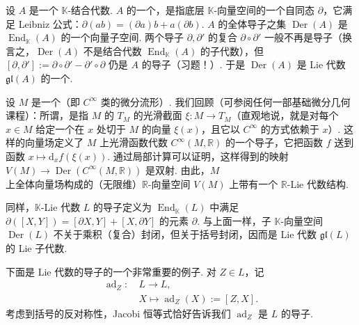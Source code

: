 \begin{numpara}[代数的导子]\label{np:ssl-1-1-3}
设 $A$ 是一个 $\mathbb{K}$-结合代数. $A$ 的一个，是指底层 $\mathbb{K}$-向量空间的一个自同态 $\partial$，它满足 Leibniz 公式：$\partial(ab)=(\partial a)b+a(\partial b)$. $A$ 的全体导子之集 $\operatorname{Der}(A)$ 是 $\operatorname{End}_{\mathbb{K}}(A)$ 的一个向量子空间. 两个导子 $\partial,\partial'$ 的复合 $\partial\circ\partial'$ 一般不再是导子（换言之，$\operatorname{Der}(A)$ 不是结合代数 $\operatorname{End}_{\mathbb{K}}(A)$ 的子代数），但 $[\partial,\partial']:=\partial\circ\partial'-\partial'\circ\partial$ 仍是 $A$ 的导子（习题！）. 于是 $\operatorname{Der}(A)$ 是 Lie 代数 $\mathfrak{gl}(A)$ 的一个.
\end{numpara}

\begin{example*}
设 $M$ 是一个（即 $C^\infty$ 类的微分流形）. 我们回顾（可参阅任何一部基础微分几何课程）：所谓，是指 $M$ 的 $T_M$ 的光滑截面 $\xi\colon M\longrightarrow T_M$（直观地说，就是对每个 $x\in M$ 给定一个在 $x$ 处切于 $M$ 的向量 $\xi(x)$，且它以 $C^\infty$ 的方式依赖于 $x$）. 这样的向量场定义了 $M$ 上光滑函数代数 $C^\infty(M,\mathbb{R})$ 的一个导子，它把函数 $f$ 送到函数 $x\mapsto\mathrm{d}_x f(\xi(x))$. 通过局部计算可以证明，这样得到的映射 $V(M)\longrightarrow\operatorname{Der}(C^\infty(M,\mathbb{R}))$ 是双射. 由此，$M$ 上全体向量场构成的（无限维）$\mathbb{R}$-向量空间 $V(M)$ 上带有一个 $\mathbb{R}$-Lie 代数结构.
\end{example*}

同样，$\mathbb{K}$-Lie 代数 $L$ 的导子定义为 $\operatorname{End}_{\mathbb{K}}(L)$ 中满足 $\partial([X,Y])=[\partial X,Y]+[X,\partial Y]$ 的元素 $\partial$. 与上面一样，子 $\mathbb{K}$-向量空间 $\operatorname{Der}(L)$ 不关于乘积（复合）封闭，但关于括号封闭，因而是 Lie 代数 $\mathfrak{gl}(L)$ 的 Lie 子代数.

\begin{example*}
下面是 Lie 代数的导子的一个非常重要的例子. 对 $Z\in L$，记
\[
\begin{aligned}
\operatorname{ad}_Z\colon\ & L\to L,\\
& X\mapsto\operatorname{ad}_Z(X):=[Z,X].
\end{aligned}
\]
考虑到括号的反对称性，Jacobi 恒等式恰好告诉我们 $\operatorname{ad}_Z$ 是 $L$ 的导子.
\end{example*}

